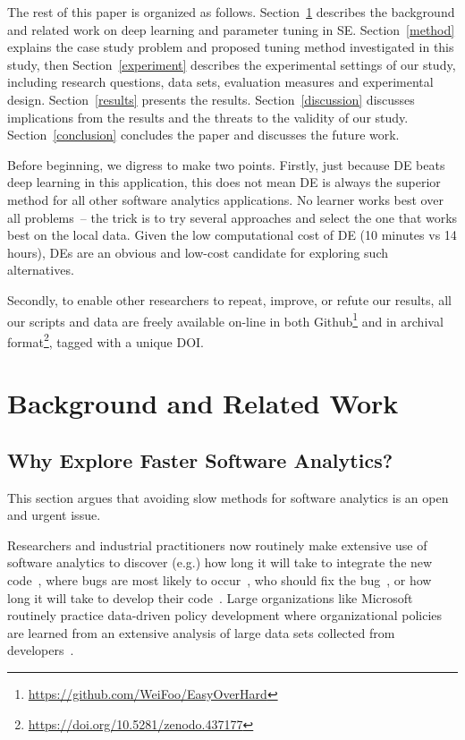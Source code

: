 \documentclass[sigconf]{acmart}
\theoremstyle{break}
\begin{document}
The rest of this paper is organized as follows. Section~\ref{background} describes the background and related work on deep learning and parameter tuning in SE. Section~\ref{method} explains the case study problem and proposed tuning method investigated in this study, then Section~\ref{experiment} describes the
experimental settings of our study, including research questions, data sets, evaluation measures and experimental design.
Section~\ref{results} presents the results. Section~\ref{discussion} discusses implications from the results and the threats to the validity of our study. Section~\ref{conclusion} concludes the paper and discusses the future work.

Before beginning, we digress to make two points.
Firstly, just because DE beats deep learning
in this application, this does not mean DE is always the superior method for all other software analytics applications. No learner works best over all problems~\cite{wolpert1996lack}-- the trick is to try several approaches and select the one that works best on the local data. Given the low computational cost of DE (10 minutes vs 14 hours), DEs are an obvious and low-cost candidate for exploring such alternatives. 

Secondly, to enable other researchers to repeat, improve, or
refute our results, all our scripts and data are 
freely available on-line in both
Github\footnote{\url{https://github.com/WeiFoo/EasyOverHard}} and in archival format\footnote{\url{https://doi.org/10.5281/zenodo.437177}}, tagged with a unique DOI.



\section{Background and Related Work}\label{background}

\subsection{Why Explore Faster Software Analytics?}
This section argues that
avoiding slow methods for software analytics is an 
open and urgent issue.

Researchers and industrial practitioners now routinely make extensive use of software analytics to discover (e.g.) how long it will take to integrate the new code~\cite{czerwonka2011crane}, where bugs are most likely to occur~\cite{ostrand2004bugs}, who should fix the bug~\cite{anvik2006should}, or how long it will take to develop their code~\cite{kocaguneli2012value,kocaguneli2012exploiting,molokken2003review}.  Large organizations like Microsoft routinely practice data-driven policy development where organizational policies are learned from an extensive analysis of large data sets collected from developers~\cite{begel2014analyze,theisen2015approximating}.
\end{document}
